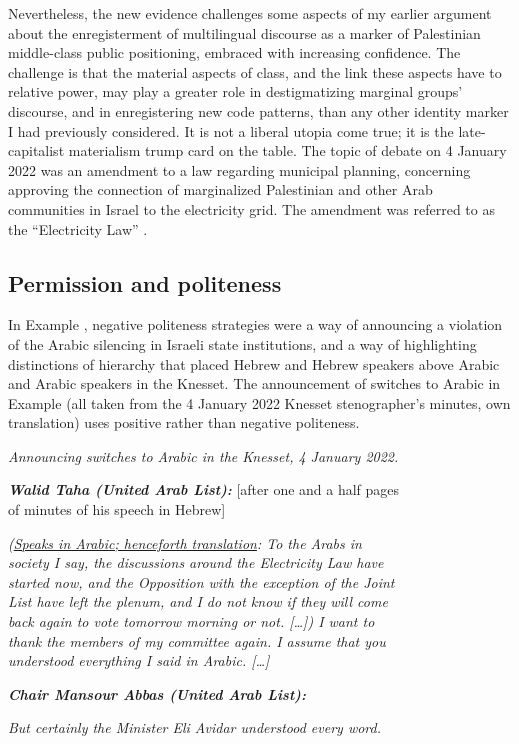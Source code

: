 \documentclass[output=paper,arabicfont]{langscibook}
\begin{document}
Nevertheless, the new evidence challenges some aspects of my earlier argument about the enregisterment of multilingual discourse as a marker of Palestinian middle-class public positioning, embraced with increasing confidence. The challenge is that the material aspects of class, and the link these aspects have to relative power, may play a greater role in destigmatizing marginal groups’ discourse, and in enregistering new code patterns, than any other identity marker I had previously considered. It is not a liberal utopia come true; it is the late-capitalist materialism trump card on the table. The topic of debate on 4 January 2022 was an amendment to a law regarding municipal planning, concerning approving the connection of marginalized Palestinian and other Arab communities in Israel to the electricity grid. The amendment was referred to as the “Electricity Law” \citep{knesset2022-b}.

\subsection{Permission and politeness}

In Example , negative politeness strategies were a way of announcing a violation of the Arabic silencing in Israeli state institutions, and a way of highlighting distinctions of hierarchy that placed Hebrew and Hebrew speakers above Arabic and Arabic speakers in the Knesset. The announcement of switches to Arabic in Example  (all taken from the 4 January 2022 Knesset stenographer’s minutes, own translation) uses positive rather than negative politeness.


\begin{exe}\ex\label{hawker:ex2}
\textit{Announcing switches to Arabic in the Knesset, 4 January 2022.}
 \begin{xlist}
\label{hawker:ex2a}
 \textit{\textbf{Walid Taha (United Arab List):}} [after one and a half pages \\
of minutes of his speech in Hebrew]

\textit{(\ul{Speaks in Arabic; henceforth translation}: To the Arabs in \\
society I say, the discussions around the Electricity Law have \\
started now, and the Opposition with the exception of the Joint \\
List have left the plenum, and I do not know if they will come \\
back again to vote tomorrow morning or not. […]) I want to \\
thank the members of my committee again. I assume that you \\
understood everything I said in Arabic. […]}

\textbf{\textit{Chair Mansour Abbas (United Arab List):}}

\textit{But certainly the Minister Eli Avidar understood every word.}
\end{xlist}
\end{exe}
\end{document}
